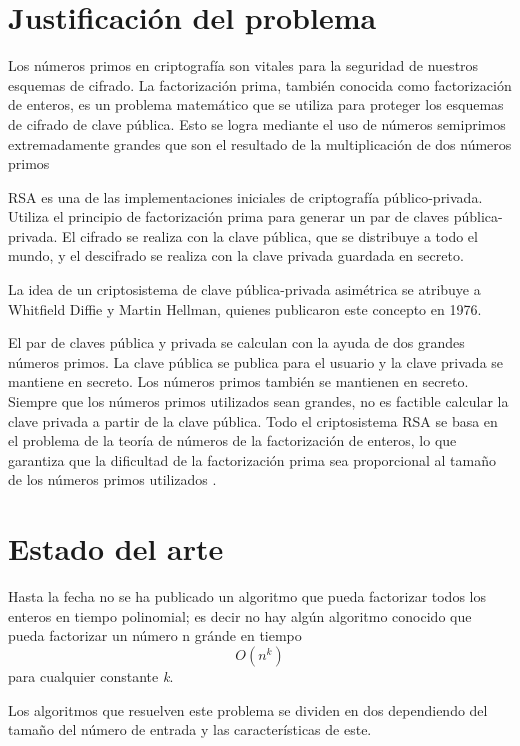 \documentclass{article}
\begin{document}
\section{Justificación del problema}

Los números primos en criptografía son vitales para la seguridad de nuestros
esquemas de cifrado. La factorización prima, también conocida como factorización
de enteros, es un problema matemático que se utiliza para proteger los esquemas
de cifrado de clave pública. Esto se logra mediante el uso de números semiprimos
extremadamente grandes que son el resultado de la multiplicación de dos números
primos \cite{sedgewick2015introduction}

RSA es una de las implementaciones iniciales de criptografía público-privada.
Utiliza el principio de factorización prima para generar un par de claves
pública-privada. El cifrado se realiza con la clave pública, que se distribuye a
todo el mundo, y el descifrado se realiza con la clave privada guardada en
secreto.

La idea de un criptosistema de clave pública-privada asimétrica se atribuye a
Whitfield Diffie y Martin Hellman, quienes publicaron este concepto en 1976.

El par de claves pública y privada se calculan con la ayuda de dos grandes
números primos. La clave pública se publica para el usuario y la clave privada
se mantiene en secreto. Los números primos también se mantienen en secreto.
Siempre que los números primos utilizados sean grandes, no es factible calcular
la clave privada a partir de la clave pública. Todo el criptosistema RSA se basa
en el problema de la teoría de números de la factorización de enteros, lo que
garantiza que la dificultad de la factorización prima sea proporcional al tamaño
de los números primos utilizados \cite{raj2019foundations}.


\section{Estado del arte}

Hasta la fecha no se ha publicado un algoritmo que pueda factorizar todos los
enteros en tiempo polinomial; es decir no hay algún algoritmo conocido que pueda
factorizar un número n gránde en tiempo $$ O(n^k)$$ para cualquier constante
\textit{k}.

Los algoritmos que resuelven este problema se dividen en dos dependiendo del
tamaño del número de entrada y las características de este.
\end{document}
